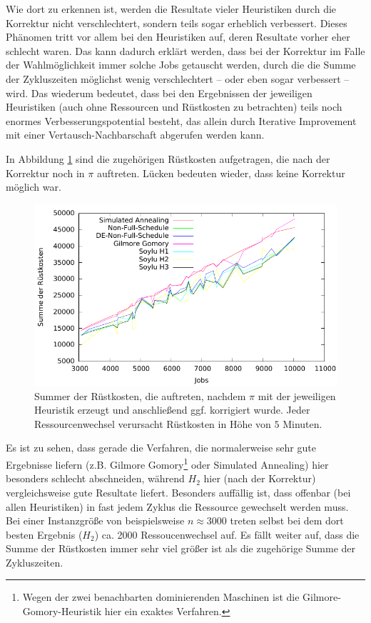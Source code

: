 \documentclass{scrreprt}
\begin{document}
Wie dort zu erkennen ist, werden die Resultate vieler Heuristiken durch die Korrektur nicht verschlechtert, sondern teils sogar erheblich verbessert.
Dieses Phänomen tritt vor allem bei den Heuristiken auf, deren Resultate vorher eher schlecht waren. 
Das kann dadurch erklärt werden, dass bei der Korrektur im Falle der Wahlmöglichkeit immer solche Jobs getauscht werden,
durch die die Summe der Zykluszeiten möglichst wenig verschlechtert -- oder eben sogar verbessert -- wird.
Das wiederum bedeutet, dass bei den Ergebnissen der jeweiligen Heuristiken (auch ohne Ressourcen und Rüstkosten zu betrachten)
teils noch enormes Verbesserungspotential besteht, das allein durch Iterative Improvement mit einer Vertausch-Nachbarschaft abgerufen werden kann.

In Abbildung \ref{abb:kbcoplot} sind die zugehörigen Rüstkosten aufgetragen, die nach der Korrektur noch in $\pi$ auftreten.
Lücken bedeuten wieder, dass keine Korrektur möglich war.
\begin{figure}
    \begin{center}
        \includegraphics[width=.8\textwidth]{../prog/heuristics/plots/kbcoplot.pdf}
    \end{center}
    \caption{
        \label{abb:kbcoplot}
        Summer der Rüstkosten, die auftreten, nachdem $\pi$ mit der jeweiligen Heuristik erzeugt und anschließend ggf. korrigiert wurde.
        Jeder Ressourcenwechsel verursacht Rüstkosten in Höhe von $5$ Minuten.
    }
\end{figure}
Es ist zu sehen, dass gerade die Verfahren, die normalerweise sehr gute Ergebnisse liefern (z.B. Gilmore Gomory\footnote{
Wegen der zwei benachbarten dominierenden Maschinen ist die Gilmore-Gomory-Heuristik hier ein exaktes Verfahren.} oder Simulated Annealing)
hier besonders schlecht abschneiden, während $H_2$ hier (nach der Korrektur) vergleichsweise gute Resultate liefert.
Besonders auffällig ist, dass offenbar (bei allen Heuristiken) in fast jedem Zyklus die Ressource gewechselt werden muss.
Bei einer Instanzgröße von beispielsweise $n\approx 3000$ treten selbst bei dem dort besten Ergebnis ($H_2$) ca. 2000 Ressoucenwechsel auf.
Es fällt weiter auf, dass die Summe der Rüstkosten immer sehr viel größer ist als die zugehörige Summe der Zykluszeiten.
\end{document}
